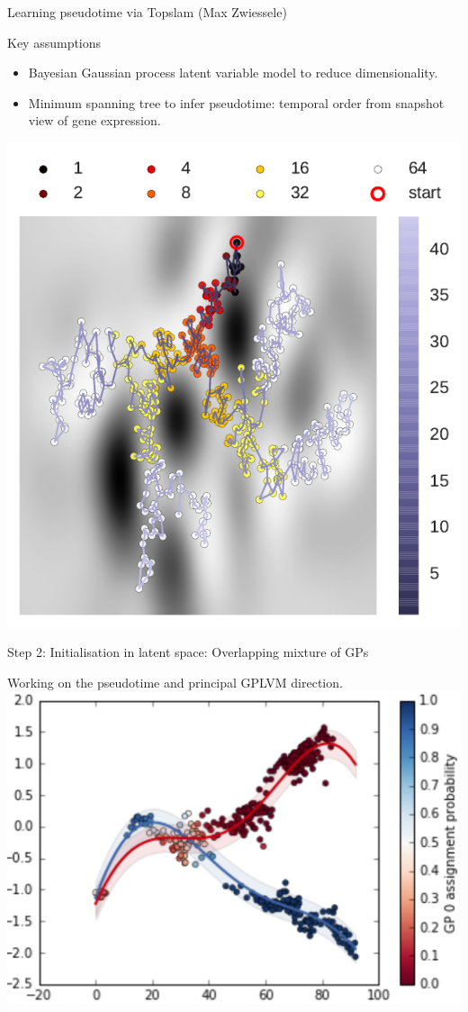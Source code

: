 \documentclass[ignorenonframetext]{beamer}
\begin{document}
\begin{frame}{Learning pseudotime via Topslam (Max Zwiessele)}
\begin{block}{Key assumptions}
\small
\begin{itemize}
\item Bayesian Gaussian process latent variable model to reduce dimensionality. 
\item Minimum spanning tree to infer pseudotime: temporal order from snapshot view of gene expression.
\end{itemize}
\end{block}

 \begin{center}
 \includegraphics[width=.45\textwidth]{BGPLVMknn50010.pdf}      
 \end{center}
\end{frame}    


\begin{frame}{Step 2: Initialisation in latent space: Overlapping mixture of GPs}
 \begin{center}
 Working on the pseudotime and principal GPLVM direction.
 \includegraphics[width=.75\textwidth]{OMGP}      
 \end{center}
\end{frame}    
\end{document}
